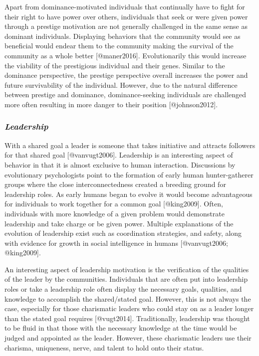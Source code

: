 \documentclass[
]{article}
\begin{document}
Apart from dominance-motivated individuals that continually have to
fight for their right to have power over others, individuals that seek
or were given power through a prestige motivation are not generally
challenged in the same sense as dominant individuals. Displaying
behaviors that the community would see as beneficial would endear them
to the community making the survival of the community as a whole better
{[}@maner2016{]}. Evolutionarily this would increase the viability of
the prestigious individual and their genes. Similar to the dominance
perspective, the prestige perspective overall increases the power and
future survivability of the individual. However, due to the natural
difference between prestige and dominance, dominance-seeking individuals
are challenged more often resulting in more danger to their position
{[}@johnson2012{]}.

\hypertarget{leadership}{%
\subsubsection{\texorpdfstring{\emph{Leadership}}{Leadership}}\label{leadership}}

With a shared goal a leader is someone that takes initiative and
attracts followers for that shared goal {[}@vanvugt2006{]}. Leadership
is an interesting aspect of behavior in that it is almost exclusive to
human interaction. Discussions by evolutionary psychologists point to
the formation of early human hunter-gatherer groups where the close
interconnectedness created a breeding ground for leadership roles. As
early humans began to evolve it would become advantageous for
individuals to work together for a common goal {[}@king2009{]}. Often,
individuals with more knowledge of a given problem would demonstrate
leadership and take charge or be given power. Multiple explanations of
the evolution of leadership exist such as coordination strategies, and
safety, along with evidence for growth in social intelligence in humans
{[}@vanvugt2006; @king2009{]}.

An interesting aspect of leadership motivation is the verification of
the qualities of the leader by the communities. Individuals that are
often put into leadership roles or take a leadership role often display
the necessary goals, qualities, and knowledge to accomplish the
shared/stated goal. However, this is not always the case, especially for
those charismatic leaders who could stay on as a leader longer than the
stated goal requires {[}@vugt2014{]}. Traditionally, leadership was
thought to be fluid in that those with the necessary knowledge at the
time would be judged and appointed as the leader. However, these
charismatic leaders use their charisma, uniqueness, nerve, and talent to
hold onto their status.
\end{document}
